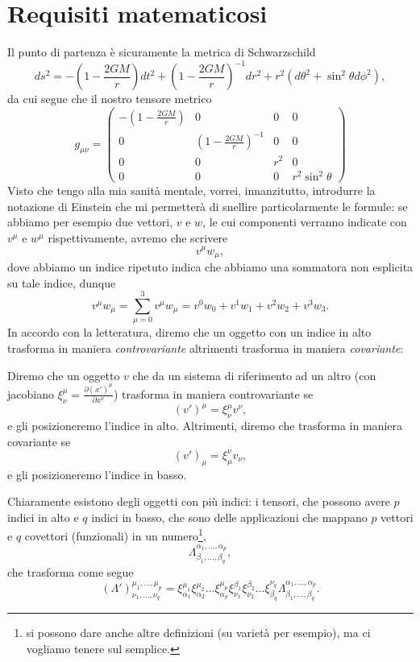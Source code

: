\documentclass[12pt, twoside, italian]{article}
\begin{document}
	\section{Requisiti matematicosi}

	Il punto di partenza è sicuramente la metrica di Schwarzschild
	$$
		ds^2 = -(1 - \frac{2GM}{r})dt^2 + (1 - \frac{2GM}{r})^{-1}dr^2 + r^2(d\theta^2 + \sin^2{\theta}d\phi^2),
	$$
	da cui segue che il nostro tensore metrico
	$$
		g_{\mu \nu} = \begin{pmatrix}
			-(1 - \frac{2GM}{r}) & 0 & 0 & 0 \\
			0 & (1-\frac{2GM}{r})^{-1} & 0 & 0 \\
			0 & 0 & r^2 & 0 \\
			0 & 0 & 0 & r^2 \sin^2{\theta}
		\end{pmatrix}
	$$
	Visto che tengo alla mia sanità mentale, vorrei, innanzitutto, introdurre la notazione di Einstein che mi permetterà di snellire particolarmente le formule: se abbiamo per esempio due vettori, $v$ e $w$, le cui componenti verranno indicate con $v^\mu$ e $w^\mu$ rispettivamente, avremo che scrivere
	$$
		v^\mu w_\mu,
	$$
	dove abbiamo un indice ripetuto indica che abbiamo una sommatora non esplicita su tale indice, dunque
	$$
		v^\mu w_\mu = \sum_{\mu=0}^3 v^\mu w_\mu = v^0 w_0 + v^1 w_1 + v^2 w_2 + v^3 w_3.
	$$
	In accordo con la letteratura, diremo che un oggetto con un indice in alto trasforma in maniera \emph{controvariante} altrimenti trasforma in maniera \emph{covariante}:
	\begin{definition}
		Diremo che un oggetto $v$ che da un sistema di riferimento ad un altro (con jacobiano $\xi^\mu_\nu = \frac{\partial (x')^\mu}{\partial x^\nu}$) trasforma in maniera controvariante se
		$$
			(v')^\mu = \xi^\mu_\nu v^\nu,
		$$
		e gli posizioneremo l'indice in alto. Altrimenti, diremo che trasforma in maniera covariante se
		$$
			(v')_\mu = \xi^\nu_\mu v_\nu,
		$$
		e gli posizioneremo l'indice in basso.
	\end{definition}
	Chiaramente esistono degli oggetti con più indici: i tensori, che possono avere $p$ indici in alto e $q$ indici in basso, che sono delle applicazioni che mappano $p$ vettori e $q$ covettori (funzionali) in un numero\footnote{si possono dare anche altre definizioni (su varietà per esempio), ma ci vogliamo tenere sul semplice.},
	$$
		\Lambda^{\alpha_1, \ldots, \alpha_p}_{\beta_1, \ldots, \beta_q},
	$$
	che trasforma come segue
	$$
		(\Lambda')^{\mu_1, \ldots, \mu_p}_{\nu_1, \ldots, \nu_q} = \xi^{\mu_{1}}_{\alpha_1} \xi^{\mu_{2}}_{\alpha_2} \ldots \xi^{\mu_p}_{\alpha_p} \xi^{\beta_1}_{\nu_1} \xi^{\beta_2}_{\nu_2} \ldots \xi^{\nu_q}_{\beta_q} \Lambda^{\alpha_1, \ldots, \alpha_p}_{\beta_1, \ldots, \beta_q}.
	$$
\end{document}
